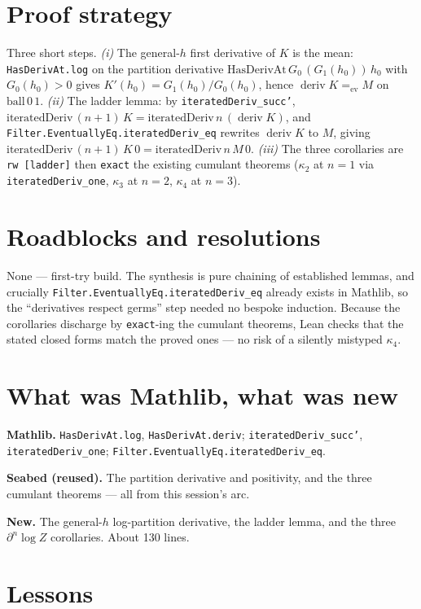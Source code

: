 \documentclass[11pt]{article}
\newcommand{\deriv}{\operatorname{deriv}}
\begin{document}
\section{Proof strategy}

Three short steps. \emph{(i)} The general-$h$ first derivative of $K$ is the
mean: \texttt{HasDerivAt.log} on the partition derivative
$\mathrm{HasDerivAt}\,G_0\,(G_1(h_0))\,h_0$ with $G_0(h_0)>0$ gives
$K'(h_0)=G_1(h_0)/G_0(h_0)$, hence $\deriv K =_{\text{ev}} M$ on
$\mathrm{ball}\,0\,1$. \emph{(ii)} The ladder lemma: by \texttt{iteratedDeriv\_succ'},
$\mathrm{iteratedDeriv}\,(n{+}1)\,K = \mathrm{iteratedDeriv}\,n\,(\deriv K)$, and
\texttt{Filter.EventuallyEq.iteratedDeriv\_eq} rewrites $\deriv K$ to $M$, giving
$\mathrm{iteratedDeriv}\,(n{+}1)\,K\,0 = \mathrm{iteratedDeriv}\,n\,M\,0$.
\emph{(iii)} The three corollaries are \texttt{rw [ladder]} then \texttt{exact}
the existing cumulant theorems ($\kappa_2$ at $n=1$ via \texttt{iteratedDeriv\_one},
$\kappa_3$ at $n=2$, $\kappa_4$ at $n=3$).

\section{Roadblocks and resolutions}

None --- first-try build. The synthesis is pure chaining of established
lemmas, and crucially \texttt{Filter.EventuallyEq.iteratedDeriv\_eq} already
exists in Mathlib, so the ``derivatives respect germs'' step needed no bespoke
induction. Because the corollaries discharge by \texttt{exact}-ing the cumulant
theorems, Lean checks that the stated closed forms match the proved ones ---
no risk of a silently mistyped $\kappa_4$.

\section{What was Mathlib, what was new}

\textbf{Mathlib.} \texttt{HasDerivAt.log}, \texttt{HasDerivAt.deriv};
\texttt{iteratedDeriv\_succ'}, \texttt{iteratedDeriv\_one};
\texttt{Filter.EventuallyEq.iteratedDeriv\_eq}.

\textbf{Seabed (reused).} The partition derivative and positivity, and the
three cumulant theorems --- all from this session's arc.

\textbf{New.} The general-$h$ log-partition derivative, the ladder lemma, and
the three $\partial^n\log Z$ corollaries. About 130 lines.

\section{Lessons}
\end{document}
